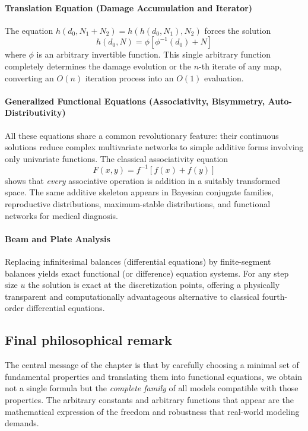 \paragraph{Translation Equation (Damage Accumulation and Iterator)}
The equation $h(d_0,N_1+N_2)=h(h(d_0,N_1),N_2)$ forces the solution
\[
h(d_0,N)=\phi[\phi^{-1}(d_0)+N]
\]
where $\phi$ is an arbitrary invertible function. This single arbitrary function completely determines the damage evolution or the $n$-th iterate of any map, converting an $O(n)$ iteration process into an $O(1)$ evaluation.

\paragraph{Generalized Functional Equations (Associativity, Bisymmetry, Auto-Distributivity)}
All these equations share a common revolutionary feature: their continuous solutions reduce complex multivariate networks to simple additive forms involving only univariate functions. The classical associativity equation
\[
F(x,y)=f^{-1}[f(x)+f(y)]
\]
shows that \emph{every} associative operation is addition in a suitably transformed space. The same additive skeleton appears in Bayesian conjugate families, reproductive distributions, maximum-stable distributions, and functional networks for medical diagnosis.

\paragraph{Beam and Plate Analysis}
Replacing infinitesimal balances (differential equations) by finite-segment balances yields exact functional (or difference) equation systems. For any step size $u$ the solution is exact at the discretization points, offering a physically transparent and computationally advantageous alternative to classical fourth-order differential equations.

\subsection{Final philosophical remark}

The central message of the chapter is that by carefully choosing a minimal set of fundamental properties and translating them into functional equations, we obtain not a single formula but the \emph{complete family} of all models compatible with those properties. The arbitrary constants and arbitrary functions that appear are the mathematical expression of the freedom and robustness that real-world modeling demands.

